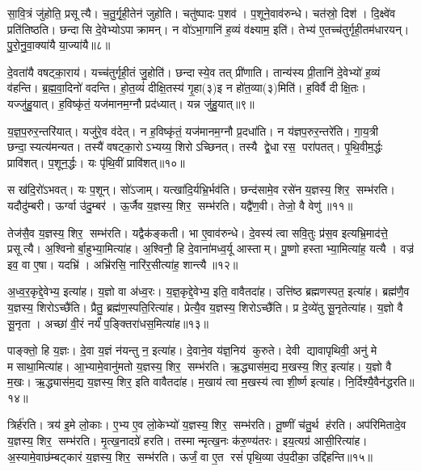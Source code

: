 सा॒वि॒त्रं जु॑होति॒ प्रसूत्यै। 
च॒तु॒र्गृ॒ही॒तेन॑ जुहोति। 
चतु॑ष्पादः प॒शव॑। 
प॒शूने॒वाव॑रुन्धे। 
चत॑स्रो॒ दिश॑। 
दि॒क्ष्वे॑व प्रति॑तिष्ठति। 
छन्दासि दे॒वेभ्योऽपाक्रामन्। 
न वो॑ऽभा॒गानि॑ ह॒व्यं व॑क्ष्याम॒ इति॑। 
तेभ्य॑ ए॒तच्च॑तुर्गृही॒तम॑धारयन्। 
पु॒रो॒नु॒वा॒क्या॑यै या॒ज्या॑यै॥८॥

दे॒वता॑यै वषट्का॒राय॑। 
यच्च॑तुर्गृही॒तं जु॒होति॑। 
छन्दास्ये॒व तत् प्री॑णाति। 
तान्य॑स्य प्री॒तानि॑ दे॒वेभ्यो॑ ह॒व्यं व॑हन्ति। 
ब्र॒ह्म॒वा॒दिनो॑ वदन्ति। 
हो॒त॒व्यं॑ दीक्षि॒तस्य॑ गृ॒हा(३)इ न हो॑त॒व्या(३)मिति॑। 
ह॒विर्\mbox{}वै दीक्षि॒तः। 
यज्जु॑हु॒यात्। 
ह॒विष्कृ॑तं॒ यज॑मानम॒ग्नौ प्रद॑ध्यात्। 
यन्न जु॑हु॒यात्॥९॥

य॒ज्ञ॒प॒रुर॒न्तरि॑यात्। 
यजु॑रे॒व व॑देत्। 
न ह॒विष्कृ॑तं॒ यज॑मानम॒ग्नौ प्र॒दधा॑ति। 
न य॑ज्ञप॒रुर॒न्तरे॑ति। 
गा॒य॒त्री छन्दा॒स्यत्य॑मन्यत। 
तस्यै॑ वषट्का॒रोऽभ्यय्य॒ शिरोऽच्छिनत्। 
तस्यै द्वे॒धा रस॒ परा॑पतत्। 
पृ॒थि॒वीम॒र्द्धः प्रावि॑शत्। 
प॒शून॒र्द्धः। 
यः पृ॑थि॒वीं प्रावि॑शत्॥१०॥

स ख॑दि॒रो॑ऽभवत्। 
यः प॒शून्। 
सो॑ऽजाम्। 
यत्खा॑दि॒र्यभ्रि॒र्भ\-व॑ति। 
छन्द॑सामे॒व रसे॑न य॒ज्ञस्य॒ शिर॒ सम्भ॑रति। 
यदौदु॑म्बरी। 
ऊर्ग्वा उ॑दु॒म्बर॑। 
ऊ॒र्जैव य॒ज्ञस्य॒ शिर॒ सम्भ॑रति। 
यद्वै॑ण॒वी। 
तेजो॒ वै वेणु॑॥११॥

तेज॑सै॒व य॒ज्ञस्य॒ शिर॒ सम्भ॑रति। 
यद्वैक॑ङ्कती। 
भा ए॒वाव॑रुन्धे। 
दे॒वस्य॑ त्वा सवि॒तुः प्र॑स॒व इत्यभ्रि॒माद॑त्ते॒ प्रसूत्यै। 
अ॒श्विनोर्बा॒हुभ्या॒\-मित्या॑ह। 
अ॒श्विनौ॒ हि दे॒वाना॑मध्व॒र्यू आस्ताम्। 
पू॒ष्णो हस्ताभ्या॒मित्या॑ह॒ यत्यै। 
वज्र॑ इव॒ वा ए॒षा। 
यदभ्रि॑। 
अभ्रि॑रसि॒ नारि॑र॒सीत्या॑ह॒ शान्त्यै॥१२॥

अ॒ध्व॒र॒कृद्दे॒वेभ्य॒ इत्या॑ह। 
य॒ज्ञो वा अ॑ध्व॒रः। 
य॒ज्ञ॒कृद्दे॒वेभ्य॒ इति॒ वावैतदा॑ह। 
उत्ति॑ष्ठ ब्रह्मणस्पत॒ इत्या॑ह। 
ब्रह्म॑णै॒व य॒ज्ञस्य॒ शिरोऽच्छै॑ति। 
प्रैतु॒ ब्रह्म॑ण॒स्पति॒रित्या॑ह। 
प्रेत्यै॒व य॒ज्ञस्य॒ शिरोऽच्छै॑ति। 
प्र दे॒व्ये॑तु सू॒नृतेत्या॑ह। 
य॒ज्ञो वै सू॒नृता। 
अच्छा॑ वी॒रं नर्यं॑ प॒ङ्क्तिरा॑धस॒मित्या॑ह॥१३॥

पाङ्क्तो॒ हि य॒ज्ञः। 
दे॒वा य॒ज्ञं न॑यन्तु न॒ इत्या॑ह। 
दे॒वाने॒व य॑ज्ञ॒निय॑ कुरुते। 
देवी द्यावापृथिवी॒ अनु॑ मे मसाथा॒मित्या॑ह। 
आ॒भ्यामे॒वानु॑मतो य॒ज्ञस्य॒ शिर॒ सम्भ॑रति। 
ऋ॒द्ध्यास॑म॒द्य म॒खस्य॒ शिर॒ इत्या॑ह। 
य॒ज्ञो वै म॒खः। 
ऋ॒द्ध्यास॑म॒द्य य॒ज्ञस्य॒ शिर॒ इति वावैतदा॑ह। 
म॒खाय॑ त्वा म॒खस्य॑ त्वा शी॒र्ष्ण इत्या॑ह। 
नि॒र्दिश्यै॒वैन॑द्धरति॥१४॥

त्रिर्\mbox{}ह॑रति। 
त्रय॑ इ॒मे लो॒काः। 
ए॒भ्य ए॒व लो॒केभ्यो॑ य॒ज्ञस्य॒ शिर॒ सम्भ॑रति। 
तू॒ष्णीं च॑तु॒र्थ ह॑रति। 
अप॑रिमितादे॒व य॒ज्ञस्य॒ शिर॒ सम्भ॑रति। 
मृ॒त्ख॒नादग्रे॑ हरति। 
तस्मान्मृत्ख॒नः क॑रु॒ण्य॑तरः। 
इय॒त्यग्र॑ आसी॒रित्या॑ह। 
अ॒स्यामे॒वाछ॑म्बट्कारं य॒ज्ञस्य॒ शिर॒ सम्भ॑रति। 
ऊर्जं॒ वा ए॒त रसं॑ पृथि॒व्या उ॑प॒दीका॒ उद्दि॑हन्ति॥१५॥

